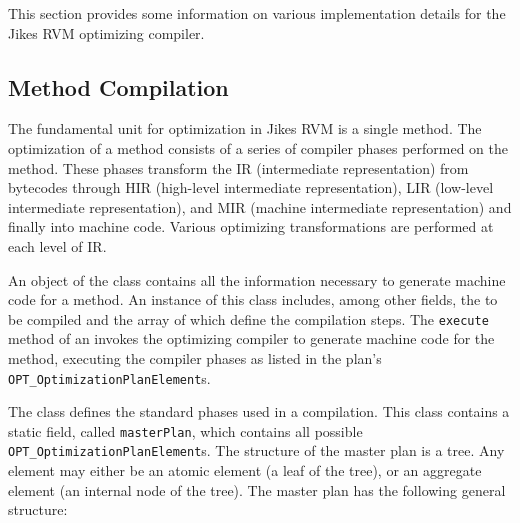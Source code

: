 This section provides some information on various
implementation details for the Jikes\TMweb{} RVM optimizing compiler.

\subsection{Method Compilation}
\label{sec:optdriver}
The fundamental unit for optimization in Jikes RVM is a single method. 
The optimization of a method consists of a series of 
compiler phases performed on the method. These 
phases transform the  
IR (intermediate representation) from bytecodes through 
HIR (high-level intermediate representation), 
LIR (low-level intermediate representation), and 
MIR (machine intermediate representation) and finally into machine code. 
Various optimizing transformations are performed at each level of IR.

An object of the class 
contains all the  
information necessary to generate machine code for a method. 
An instance of this class includes, among other fields, 
the 
to be compiled and the array of 
which define the compilation steps.
The {\tt execute} method of an
invokes the optimizing compiler to generate machine code for the method,
executing the compiler phases as listed in the plan's
{\tt OPT\_OptimizationPlanElement}s.

The 
class defines the standard phases used in a compilation.
This class
contains a static field, called {\tt masterPlan}, which contains all
possible {\tt OPT\_\-Op\-ti\-mi\-za\-tion\-Plan\-El\-e\-ment}s.
The structure of the master plan is 
a tree. Any element may either be an atomic element (a leaf of the 
tree), or an aggregate element (an internal node of the tree).
The master plan has the following general structure:


